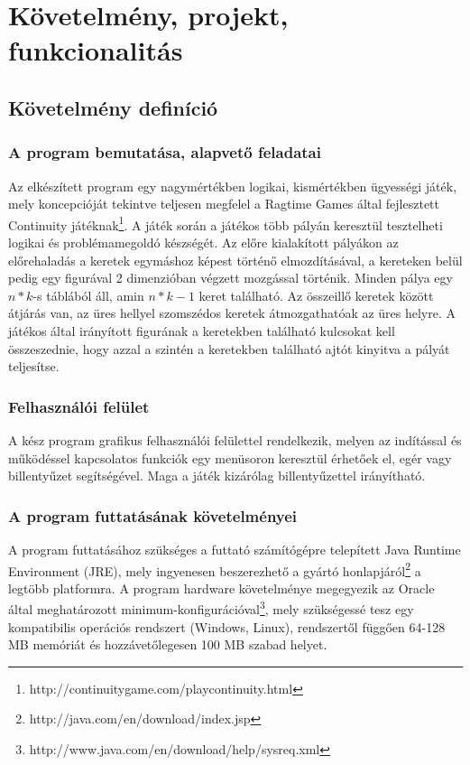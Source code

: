 



\fedlap
\tableofcontents

\addtocounter{section}{1}
\section{Követelmény, projekt, funkcionalitás}

\subsection{Követelmény definíció}

    \subsubsection{A program bemutatása, alapvető feladatai}
Az elkészített program egy nagymértékben logikai, kismértékben ügyességi játék, mely koncepcióját tekintve teljesen megfelel a Ragtime Games által fejlesztett Continuity játéknak\footnote{http://continuitygame.com/playcontinuity.html}. A játék során a játékos több pályán keresztül tesztelheti logikai és problémamegoldó készségét. Az előre kialakított pályákon az előrehaladás a keretek egymáshoz képest történő elmozdításával, a kereteken belül pedig egy figurával 2 dimenzióban végzett mozgással történik. Minden pálya egy $n*k$-s táblából áll, amin $n*k-1$ keret található. Az összeillő keretek között átjárás van, az üres hellyel szomszédos keretek átmozgathatóak az üres helyre. A játékos által irányított figurának a keretekben található kulcsokat kell összeszednie, hogy azzal a szintén a keretekben található ajtót kinyitva a pályát teljesítse.

    \subsubsection{Felhasználói felület}
A kész program grafikus felhasználói felülettel rendelkezik, melyen az indítással és működéssel kapcsolatos funkciók egy menüsoron keresztül érhetőek el, egér vagy billentyűzet segítségével. Maga a játék kizárólag billentyűzettel irányítható.

    \subsubsection{A program futtatásának követelményei}
A program futtatásához szükséges a futtató számítógépre telepített Java Runtime Environment (JRE), mely ingyenesen beszerezhető a gyártó honlapjáról\footnote{http://java.com/en/download/index.jsp} a legtöbb platformra. A program hardware követelménye megegyezik az Oracle által meghatározott minimum-konfigurációval\footnote{http://www.java.com/en/download/help/sysreq.xml}, mely szükségessé tesz egy kompatibilis operációs rendszert (Windows, Linux), rendszertől függően 64-128 MB memóriát és hozzávetőlegesen 100 MB szabad helyet.

